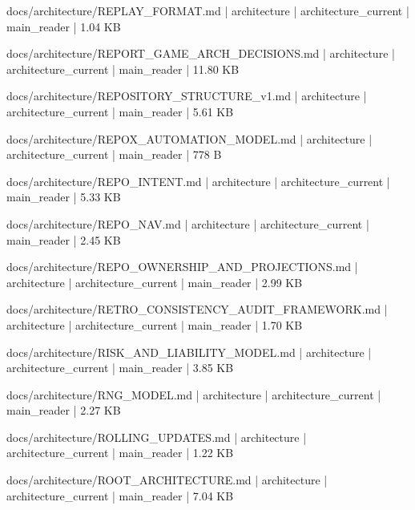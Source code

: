 \documentclass[11pt,a4paper]{report}
\begin{document}
{\small\ttfamily\raggedright docs/\allowbreak{}architecture/\allowbreak{}REPLAY\_FORMAT.\allowbreak{}md | architecture | architecture\_current | main\_reader | 1.\allowbreak{}04 KB\par}
{\small\ttfamily\raggedright docs/\allowbreak{}architecture/\allowbreak{}REPORT\_GAME\_ARCH\_DECISIONS.\allowbreak{}md | architecture | architecture\_current | main\_reader | 11.\allowbreak{}80 KB\par}
{\small\ttfamily\raggedright docs/\allowbreak{}architecture/\allowbreak{}REPOSITORY\_STRUCTURE\_v1.\allowbreak{}md | architecture | architecture\_current | main\_reader | 5.\allowbreak{}61 KB\par}
{\small\ttfamily\raggedright docs/\allowbreak{}architecture/\allowbreak{}REPOX\_AUTOMATION\_MODEL.\allowbreak{}md | architecture | architecture\_current | main\_reader | 778 B\par}
{\small\ttfamily\raggedright docs/\allowbreak{}architecture/\allowbreak{}REPO\_INTENT.\allowbreak{}md | architecture | architecture\_current | main\_reader | 5.\allowbreak{}33 KB\par}
{\small\ttfamily\raggedright docs/\allowbreak{}architecture/\allowbreak{}REPO\_NAV.\allowbreak{}md | architecture | architecture\_current | main\_reader | 2.\allowbreak{}45 KB\par}
{\small\ttfamily\raggedright docs/\allowbreak{}architecture/\allowbreak{}REPO\_OWNERSHIP\_AND\_PROJECTIONS.\allowbreak{}md | architecture | architecture\_current | main\_reader | 2.\allowbreak{}99 KB\par}
{\small\ttfamily\raggedright docs/\allowbreak{}architecture/\allowbreak{}RETRO\_CONSISTENCY\_AUDIT\_FRAMEWORK.\allowbreak{}md | architecture | architecture\_current | main\_reader | 1.\allowbreak{}70 KB\par}
{\small\ttfamily\raggedright docs/\allowbreak{}architecture/\allowbreak{}RISK\_AND\_LIABILITY\_MODEL.\allowbreak{}md | architecture | architecture\_current | main\_reader | 3.\allowbreak{}85 KB\par}
{\small\ttfamily\raggedright docs/\allowbreak{}architecture/\allowbreak{}RNG\_MODEL.\allowbreak{}md | architecture | architecture\_current | main\_reader | 2.\allowbreak{}27 KB\par}
{\small\ttfamily\raggedright docs/\allowbreak{}architecture/\allowbreak{}ROLLING\_UPDATES.\allowbreak{}md | architecture | architecture\_current | main\_reader | 1.\allowbreak{}22 KB\par}
{\small\ttfamily\raggedright docs/\allowbreak{}architecture/\allowbreak{}ROOT\_ARCHITECTURE.\allowbreak{}md | architecture | architecture\_current | main\_reader | 7.\allowbreak{}04 KB\par}
\end{document}
